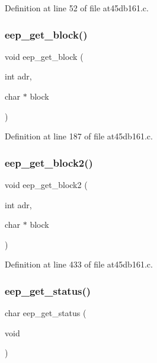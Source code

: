 Definition at line 52 of file at45db161.\+c.

\mbox{\label{at45db161_8c_a3697d03798d6b7730b11e0e0112fc1e8}} 
\subsubsection{eep\+\_\+get\+\_\+block()}
{\footnotesize\ttfamily void eep\+\_\+get\+\_\+block (\begin{DoxyParamCaption}\item[{int}]{adr,  }\item[{char $\ast$}]{block }\end{DoxyParamCaption})}



Definition at line 187 of file at45db161.\+c.

\mbox{\label{at45db161_8c_adbe54deedf31d53003c8d08da1561d11}} 
\subsubsection{eep\+\_\+get\+\_\+block2()}
{\footnotesize\ttfamily void eep\+\_\+get\+\_\+block2 (\begin{DoxyParamCaption}\item[{int}]{adr,  }\item[{char $\ast$}]{block }\end{DoxyParamCaption})}



Definition at line 433 of file at45db161.\+c.

\mbox{\label{at45db161_8c_a2f99543647ff9740dfcb82ff6349fb49}} 
\subsubsection{eep\+\_\+get\+\_\+status()}
{\footnotesize\ttfamily char eep\+\_\+get\+\_\+status (\begin{DoxyParamCaption}\item[{void}]{ }\end{DoxyParamCaption})}



